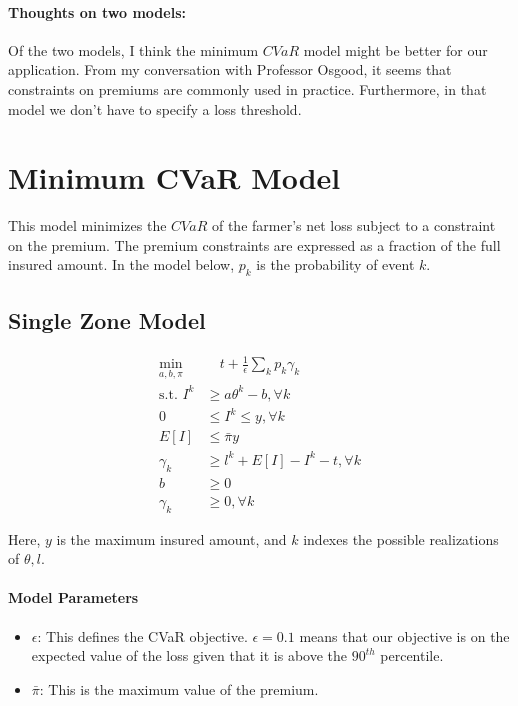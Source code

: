 \documentclass[11pt]{article}
\begin{document}
\paragraph*{Thoughts on two models:} Of the two models, I think the minimum $CVaR$ model might be better for our application. From my conversation with Professor Osgood, it seems that constraints on premiums are commonly used in practice. Furthermore, in that model we don't have to specify a loss threshold. 

\section{Minimum CVaR Model}
This model minimizes the $CVaR$ of the farmer's net loss subject to a constraint on the premium. The premium constraints are expressed as a fraction of the full insured amount. In the model below, $p_k$ is the probability of event $k$. 
\subsection*{Single Zone Model}
\begin{align}
    \min_{a,b,\pi} &\quad t + \frac{1}{\epsilon}\sum_k p_k \gamma_k\\
    \text{s.t.   } I^k &\geq a\theta^k - b, \forall k\\
    0 &\leq I^k \leq y, \forall k\\
    E[I] &\leq \bar{\pi}y\\
    \gamma_k &\geq l^k + E[I] -I^k -t, \forall k\\
    b &\geq 0\\
    \gamma_k &\geq 0, \forall k
\end{align}

Here, $y$ is the maximum insured amount, and $k$ indexes the possible realizations of $\theta, l$. 

\paragraph*{Model Parameters}
\begin{itemize}
    \item $\epsilon$: This defines the CVaR objective. $\epsilon = 0.1$ means that our objective is on the expected value of the loss given that it is above the $90^{th}$ percentile. 
    \item $\bar{\pi}$: This is the maximum value of the premium. 
\end{itemize}
\end{document}
